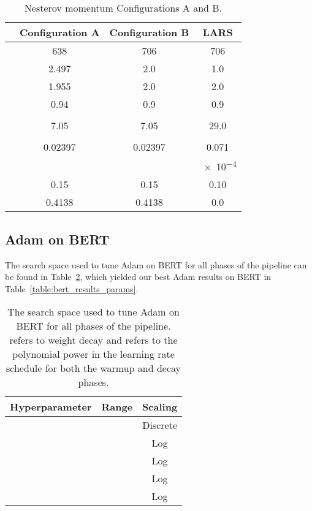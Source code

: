 \documentclass{article}
\begin{document}
\begin{table}[t]
\centering
\setlength{\extrarowheight}{3.5pt}
\begin{tabular}{|c|c|c|c|}
\hline
 & Configuration A & Configuration B & LARS \\ \hline
 & 638 & 706 & 706 \\ \hline
 & 2.497 & 2.0 & 1.0 \\ \hline
 & 1.955 & 2.0 & 2.0 \\ \hline
 & 0.94 & 0.9 & 0.9\\ \hline
 &  &  &   \\ \hline
 & 7.05 & 7.05 & 29.0 \\ \hline
 &  &  &  \\ \hline
 & 0.02397 & 0.02397 & 0.071 \\ \hline
 &  &  & \num{e-4} \\ \hline
 & 0.15 & 0.15 & 0.10 \\ \hline
 & 0.4138 & 0.4138 & 0.0 \\ \hline
\end{tabular}
\caption{Nesterov momentum Configurations A and B.}\label{table:nesterov_config}
\end{table}

\subsection{Adam on BERT}
\label{appendix:adam_bert_hparams}
The search space used to tune Adam on BERT for all phases of the pipeline can be found in Table~\ref{table:bert_adam_tuning_space}, which yielded our best Adam results on BERT in Table~\ref{table:bert_results_params}.

\begin{table}[t]
\label{table:search_space_bert}
\centering
\setlength{\extrarowheight}{3.5pt}
\begin{tabular}{|c|c|c|}
\hline
Hyperparameter & Range & Scaling \\ \hline
 &  & Discrete \\ \hline
 &  & Log \\ \hline
 &  & Log \\ \hline
 &  & Log \\ \hline
 &  & Log \\ \hline
\end{tabular}
\caption{The search space used to tune Adam on BERT for all phases of the pipeline.  refers to weight decay and  refers to the polynomial power in the learning rate schedule for both the warmup and decay phases.}
\label{table:bert_adam_tuning_space}
\end{table}
\end{document}
